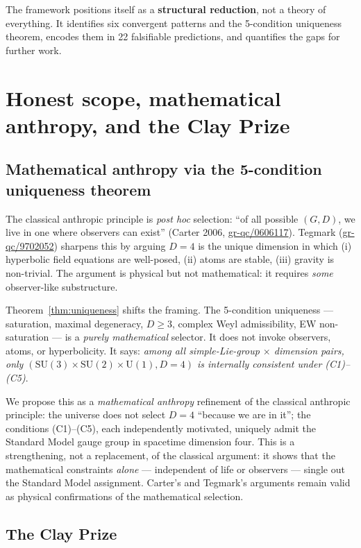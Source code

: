 \documentclass[11pt,a4paper]{article}
\newcommand{\SU}{\mathrm{SU}}
\newcommand{\Uone}{\mathrm{U}(1)}
\begin{document}
The framework positions itself as a \textbf{structural reduction}, not a theory of everything. It identifies six convergent patterns and the 5-condition uniqueness theorem, encodes them in 22 falsifiable predictions, and quantifies the gaps for further work.

\section{Honest scope, mathematical anthropy, and the Clay Prize}\label{sec:anthropy}

\subsection{Mathematical anthropy via the 5-condition uniqueness theorem}

The classical anthropic principle is \emph{post hoc} selection: ``of all possible $(G, D)$, we live in one where observers can exist'' (Carter 2006, \href{https://arxiv.org/abs/gr-qc/0606117}{gr-qc/0606117}). Tegmark (\href{https://arxiv.org/abs/gr-qc/9702052}{gr-qc/9702052}) sharpens this by arguing $D = 4$ is the unique dimension in which (i) hyperbolic field equations are well-posed, (ii) atoms are stable, (iii) gravity is non-trivial. The argument is physical but not mathematical: it requires \emph{some} observer-like substructure.

Theorem~\ref{thm:uniqueness} shifts the framing. The 5-condition uniqueness --- saturation, maximal degeneracy, $D \geq 3$, complex Weyl admissibility, EW non-saturation --- is a \emph{purely mathematical} selector. It does not invoke observers, atoms, or hyperbolicity. It says: \emph{among all simple-Lie-group $\times$ dimension pairs, only $(\SU(3) \times \SU(2) \times \Uone, D = 4)$ is internally consistent under (C1)--(C5)}.

We propose this as a \emph{mathematical anthropy} refinement of the classical anthropic principle: the universe does not select $D = 4$ ``because we are in it''; the conditions (C1)--(C5), each independently motivated, uniquely admit the Standard Model gauge group in spacetime dimension four. This is a strengthening, not a replacement, of the classical argument: it shows that the mathematical constraints \emph{alone} --- independent of life or observers --- single out the Standard Model assignment. Carter's and Tegmark's arguments remain valid as physical confirmations of the mathematical selection.

\subsection{The Clay Prize}
\end{document}
